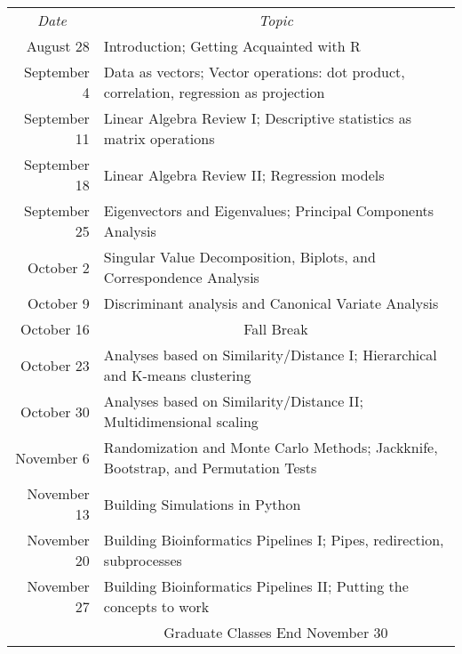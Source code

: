 \documentclass[11pt,letterpaper]{article}
\begin{document}
\renewcommand{\arraystretch}{1.4}
\begin{center}
\begin{tabular}{rp{5.5in}}
\multicolumn{1}{c}{{\sl Date}} & \multicolumn{1}{c}{{\sl Topic}} \\

August 28 & Introduction; Getting Acquainted with R \\
September 4 & Data as vectors; Vector operations: dot product, correlation, regression as projection \\
September 11 & Linear Algebra Review I; Descriptive statistics as matrix operations\\
September 18 & Linear Algebra Review II; Regression models \\
September 25 & Eigenvectors and Eigenvalues; Principal Components Analysis \\
October 2 & Singular Value Decomposition, Biplots, and Correspondence Analysis\\
October 9 & Discriminant analysis and Canonical Variate Analysis\\
October 16 & \multicolumn{1}{c}{{\sc Fall Break}} \\
October 23 & Analyses based on Similarity/Distance I; Hierarchical and K-means clustering\\
October 30 & Analyses based on Similarity/Distance II; Multidimensional scaling\\
November 6 & Randomization and Monte Carlo Methods; Jackknife, Bootstrap, and Permutation Tests\\
November 13 & Building Simulations in Python\\
November 20 & Building Bioinformatics Pipelines I; Pipes, redirection, subprocesses \\
November 27 & Building Bioinformatics Pipelines II; Putting the concepts to work \\

& \multicolumn{1}{c}{{\sc Graduate Classes End November 30}} \\
\end{tabular}
\end{center}
\end{document}
